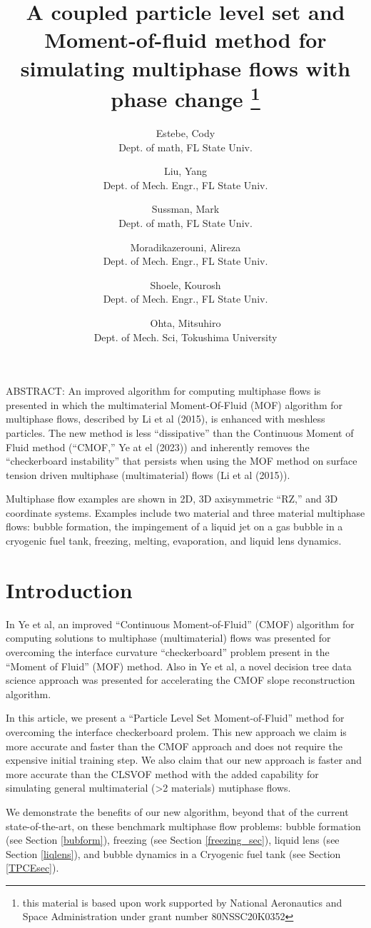 \documentclass[]{article}
\title{A coupled particle level set and Moment-of-fluid method 
  for simulating multiphase flows with phase change
  \thanks{this material is based upon work supported by National
   Aeronautics and Space Administration under grant number
   80NSSC20K0352}}
\author{
  Estebe, Cody \\
  Dept. of math, FL State Univ. 
  \and
  Liu, Yang \\
  Dept. of Mech. Engr., FL State Univ.
  \and
  Sussman, Mark \\
  Dept. of math, FL State Univ. 
  \and
  Moradikazerouni, Alireza \\
  Dept. of Mech. Engr., FL State Univ.
  \and
  Shoele, Kourosh  \\
  Dept. of Mech. Engr., FL State Univ.
  \and
  Ohta, Mitsuhiro \\
  Dept. of Mech. Sci, Tokushima University 
}
\begin{document}
\maketitle

ABSTRACT:
An improved algorithm for computing multiphase flows is presented in 
which the multimaterial Moment-Of-Fluid (MOF) algorithm for multiphase flows, 
described by Li et al (2015), is enhanced with 
meshless particles.  The new method is less ``dissipative'' than the 
Continuous Moment of Fluid method (``CMOF,'' Ye at el (2023)) and inherently 
removes the ``checkerboard instability'' that persists when using the 
MOF method on surface tension driven multiphase (multimaterial) 
flows (Li et al (2015)).

Multiphase flow examples are shown in 2D, 3D axisymmetric ``RZ,'' and 
3D coordinate systems.  Examples include two material and three 
material multiphase flows: bubble formation, the impingement of a 
liquid jet on a gas bubble in a cryogenic fuel tank, freezing, melting,
evaporation, and liquid lens dynamics.
\linenumbers
\section{Introduction}
In Ye et al\cite{YeEstebe...},
an improved ``Continuous Moment-of-Fluid'' (CMOF) algorithm
for computing solutions to multiphase (multimaterial) flows was
presented for overcoming the interface curvature ``checkerboard'' problem
present in the ``Moment of Fluid'' (MOF) \cite{MOF}  method.  
Also in Ye et al\cite{YeEstebe...}, a novel decision tree data science 
approach was presented for accelerating the CMOF slope reconstruction 
algorithm.   

In this article, we present a ``Particle Level Set Moment-of-Fluid''
method for overcoming the interface checkerboard prolem.  This new approach
we claim is more accurate and faster than the CMOF approach and 
does not require the expensive initial training step.  We also claim that
our new approach is faster and more accurate than the CLSVOF 
method\cite{SusPuckett} with the added capability for simulating
general multimaterial (>2 materials) mutiphase flows.


We 
demonstrate the benefits of our new algorithm, beyond that of the 
current state-of-the-art, on these benchmark multiphase flow
problems:
bubble formation\cite{helsby1955behaviour} (see Section \ref{bubform}),
freezing\cite{hu2010icing} (see Section \ref{freezing_sec}), 
liquid lens\cite{MIAO2021109358} (see Section \ref{liqlens}),
and bubble dynamics in a Cryogenic fuel 
tank\cite{bentz1993low} (see Section \ref{TPCEsec}).
\end{document}
